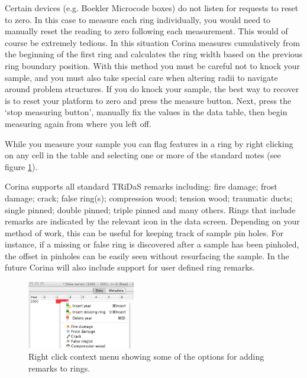 Certain devices (e.g. Boekler Microcode boxes) do not listen for requests to reset to zero.  In this case to measure each ring individually, you would need to manually reset the reading to zero following each measurement.  This would of course be extremely tedious.  In this situation Corina measures cumulatively from the beginning of the first ring and calculates the ring width based on the previous ring boundary position.  With this method you must be careful not to knock your sample, and you must also take special care when altering radii to navigate around problem structures.  If you do knock your sample, the best way to recover is to reset your platform to zero and press the measure button.  Next, press the `stop measuring button', manually fix the values in the data table, then begin measuring again from where you left off.


While you measure your sample you can flag features in a ring by right clicking on any cell in the table and selecting one or more of the standard notes (see figure \ref{fig:ringremarks}).

Corina supports all standard TRiDaS remarks including: fire damage; frost damage; crack; false ring(s); compression wood; tension wood; traumatic ducts; single pinned; double pinned; triple pinned and many others.  Rings that include remarks are indicated by the relevant icon in the data screen.  Depending on your method of work, this can be useful for keeping track of sample pin holes.  For instance, if a missing or false ring is discovered after a sample has been pinholed, the offset in pinholes can be easily seen without resurfacing the sample.  In the future Corina will also include support for user defined ring remarks.  

\begin{figure}
  \begin{center}
    \includegraphics[width=0.42\textwidth]{Images/ringremarks.png}
  \end{center}
  \caption{Right click context menu showing some of the options for adding remarks to rings.}
  \label{fig:ringremarks}
\end{figure}

